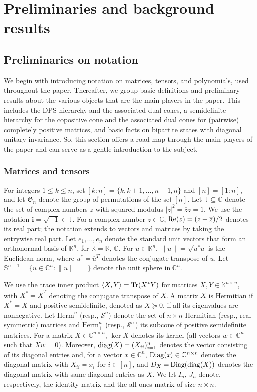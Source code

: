 \documentclass[11pt]{article}
\newcommand{\R}{\ensuremath{\mathbb{R}}}   %
\newcommand{\K}{\ensuremath{\mathbb{K}}}   %
\newcommand{\C}{\ensuremath{\mathbb{C}}} %
\newcommand{\T}{\ensuremath{\mathbb{T}}} %
\newcommand{\Perm}{\mathfrak G}
\newcommand{\MS}{{\mathcal S}}
\newcommand{\Herm}{\mathrm{Herm}}
\newcommand{\sS}{\mathbb S}
\newcommand{\Tr}{\text{\rm Tr}}
\newcommand{\diag}{\text{\rm diag}}
\newcommand{\Diag}{\text{\rm Diag}}
\newcommand{\Rea}{\text{\rm Re}}
\newcommand{\bfi}{\mathbf i}
\theoremstyle{plain}
\begin{document}
\section{Preliminaries and background results}\label{sec:background}

\subsection{Preliminaries on notation }
We begin with introducing  notation on matrices, tensors, and polynomials,
used throughout the paper.   Thereafter, we group basic definitions and preliminary results about the various objects that are the main players in the paper. This includes  the DPS hierarchy and the associated dual cones, a semidefinite  hierarchy for the copositive cone and the associated dual cones for (pairwise) completely positive matrices, and basic facts on bipartite states with diagonal unitary invariance.
So, this section offers a road map through the main players of the paper and can serve as a gentle introduction to the subject.

\subsubsection*{Matrices and tensors}

For  integers $1\le k\le n$, set $[k:n]=\{k,k+1,\ldots, n-1,n\}$ and $[n]=[1:n]$, and let $\Perm_n$ denote the group of permutations of the set $[n]$. Let $\T\subseteq \C$ denote the set of complex numbers $z$ with squared modulus $|z|^2={\overline z z}=1$. We use the notation $\bfi=\sqrt{-1}\in\T$. For a complex number $z\in \C$, $\Rea(z)=(z+\overline z)/2$ denotes its real part; the notation extends to vectors and matrices by taking the entrywise real part. Let $e_1,\ldots,e_n$ denote the standard unit vectors that form an orthonormal basis of $\K^n$, for $\K=\R$, $\C$. For   $u\in\K^n$, $\|u\|= \sqrt {u^*u}$ is the Euclidean norm, where $u^*=\overline u^T$ denotes the conjugate transpose of $u$. Let $\sS^{n-1}=\{u\in \C^n: \|u\|=1\}$ denote the unit sphere in $\C^n$.

We use the trace inner product $\langle X,Y\rangle =\Tr(X^*Y)$ for matrices $X,Y\in \K^{n\times n}$, with $X^*=\overline X^T$ denoting the conjugate transpose of $X$. A matrix $X$ is Hermitian if $X^*=X$ and positive semidefinite, denoted as $X\succeq 0$, if all its eigenvalues are nonnegative. Let $\Herm^n$ (resp., $\MS^n$) denote the set of $n\times n$ Hermitian (resp., real symmetric) matrices and $\Herm^n_+$ (resp., $\MS^n_+$) its subcone of positive semidefinite matrices. 
For a matrix $X\in \C^{n\times n}$, $\ker X$ denotes its kernel (all vectors $w\in\C^n$ such that $Xw=0$).
Moreover, $\diag(X)=(X_{ii})_{i=1}^n$ denotes the vector consisting of its diagonal entries and, for a vector $x\in \C^n$, $\Diag(x)\in\C^{n\times n}$ denotes the diagonal matrix with $X_{ii}=x_i$ for $i\in [n]$, and $D_X=\Diag(\diag(X))$ denotes the diagonal matrix with same diagonal entries as $X$. We let $I_n$, $J_n$  denote, respectively, the  identity matrix and the all-ones matrix of size $n\times n$.  
\end{document}
